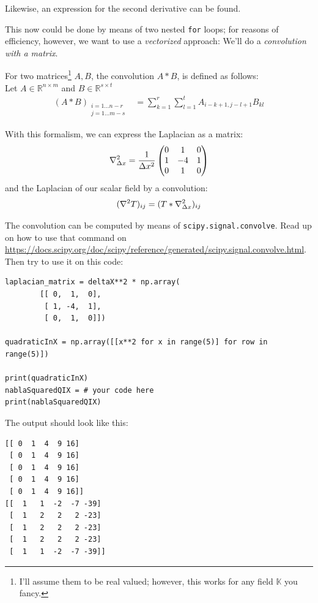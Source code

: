 \documentclass[
	english,
	fontsize=10pt,
	parskip=half,
	titlepage=true,
	DIV=12
]{scrartcl}
\newcommand*{\inPy}[1]{\texttt{#1}}
\begin{document}
Likewise, an expression for the second derivative can be found.

This now could be done by means of two nested \inPy{for} loops; for reasons of efficiency, however, we want to use a \emph{vectorized} approach: We'll do a \emph{convolution with a matrix}.

For two matrices\footnote{I'll assume them to be real valued; however, this works for any field $\mathbb{K}$ you fancy.} $A, B$, the convolution $A \ast B$, is defined as follows:\\
Let $A \in \mathbb{R}^{n \times m}$ and $B \in \mathbb{R}^{s \times t}$
\begin{align*}
	(A \ast B)_{\substack{
		i = 1 ... n-r\\
		j = 1 ... m-s
	}}
&=
	\sum_{k = 1}^{r}
	\sum_{l = 1}^{t}
		A_{i-k+1, j-l+1} B_{kl}
\end{align*}

With this formalism, we can express the Laplacian as a matrix:
\[ 
	\laplacian_{\Delta x} 
= 
	\frac{1}{\Delta x^2}
	\begin{pmatrix}
		 0 &  1 &  0 \\
		 1 & -4 &  1 \\
		 0 &  1 &  0
	\end{pmatrix}
\]
and the Laplacian of our scalar field by a convolution:
\[ (\laplacian T)_{ij} = (T \ast \laplacian_{\Delta x})_{ij} \]

The convolution can be computed by means of \texttt{scipy.signal.convolve}. Read up on how to use that command on \url{https://docs.scipy.org/doc/scipy/reference/generated/scipy.signal.convolve.html}. Then try to use it on this code:
\begin{verbatim}
laplacian_matrix = deltaX**2 * np.array(
        [[ 0,  1,  0],
         [ 1, -4,  1],
         [ 0,  1,  0]])

quadraticInX = np.array([[x**2 for x in range(5)] for row in range(5)])

print(quadraticInX)
nablaSquaredQIX = # your code here
print(nablaSquaredQIX)
\end{verbatim}

The output should look like this:
\begin{verbatim}
[[ 0  1  4  9 16]
 [ 0  1  4  9 16]
 [ 0  1  4  9 16]
 [ 0  1  4  9 16]
 [ 0  1  4  9 16]]
[[  1   1  -2  -7 -39]
 [  1   2   2   2 -23]
 [  1   2   2   2 -23]
 [  1   2   2   2 -23]
 [  1   1  -2  -7 -39]]
\end{verbatim}
\end{document}
